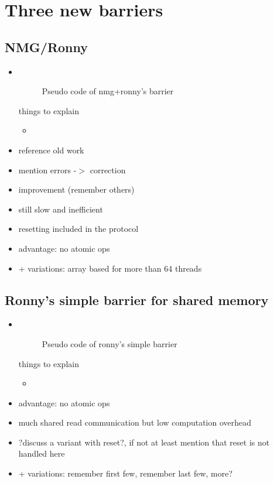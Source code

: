 \documentclass[a4paper, 10pt]{article}
\begin{document}
\section{Three new barriers}
\subsection{NMG/Ronny}
\begin{itemize}
	\item ~
		\begin{figure}[htbp]
			\centering
			
			\caption{Pseudo code of nmg+ronny's barrier}
			\label{listing:nmg-ronny-with-reset}
		\end{figure}

		things to explain
		\begin{itemize}
			\item ~
		\end{itemize}

	\item reference old work
	\item mention errors -$>$ correction
	\item improvement (remember others)
	\item still slow and inefficient
	\item resetting included in the protocol
	\item advantage: no atomic ops
	\item + variations: array based for more than 64 threads
\end{itemize}

\subsection{Ronny's simple barrier for shared memory}
\begin{itemize}
	\item ~
		\begin{figure}[htbp]
			\centering
			
			\caption{Pseudo code of ronny's simple barrier}
			\label{listing:ronny-simple-no-reset}
		\end{figure}

		things to explain
		\begin{itemize}
			\item ~
		\end{itemize}

	\item advantage: no atomic ops
	\item much shared read communication but low computation overhead
	\item ?discuss a variant with reset?, if not at least mention that reset is not handled here
	\item + variations: remember first few, remember last few, more?
\end{itemize}
\end{document}
